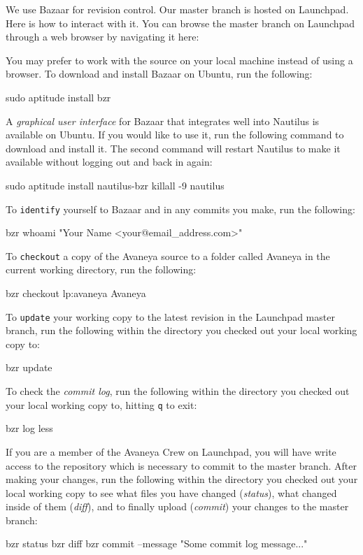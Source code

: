 
We use Bazaar for revision control. Our master branch is hosted on Launchpad. Here is how to interact with it. You can browse the master branch on Launchpad through a web browser by navigating it here:


You may prefer to work with the source on your local machine instead of using a browser. To download and install Bazaar on Ubuntu, run the following:

\StartCodeExample
\type{$} sudo aptitude install bzr
\StopCodeExample

A {\it graphical user interface} for Bazaar that integrates well into Nautilus is available on Ubuntu. If you would like to use it, run the following command to download and install it. The second command will restart Nautilus to make it available without logging out and back in again:

\StartCodeExample
\type{$} sudo aptitude install nautilus-bzr
\type{$} killall -9 nautilus
\StopCodeExample

To {\tt identify} yourself to Bazaar and in any commits you make, run the following:

\StartCodeExample
\type{$} bzr whoami "Your Name <your@email_address.com>"
\StopCodeExample

To {\tt checkout} a copy of the Avaneya source to a folder called Avaneya in the current working directory, run the following:

\StartCodeExample
\type{$} bzr checkout lp:avaneya Avaneya
\StopCodeExample

To {\tt update} your working copy to the latest revision in the Launchpad master branch, run the following within the directory you checked out your local working copy to:

\StartCodeExample
\type{$} bzr update
\StopCodeExample

To check the {\it commit log}, run the following within the directory you checked out your local working copy to, hitting {\tt q} to exit:

\StartCodeExample
\type{$} bzr log \type{|} less
\StopCodeExample

If you are a member of the Avaneya Crew on Launchpad, you will have write access to the repository which is necessary to commit to the master branch. After making your changes, run the following within the directory you checked out your local working copy to see what files you have changed ({\it status}), what changed inside of them ({\it diff}), and to finally upload ({\it commit}) your changes to the master branch:

\StartCodeExample
\type{$} bzr status
\type{$} bzr diff
\type{$} bzr commit --message "Some commit log message..."
\StopCodeExample

